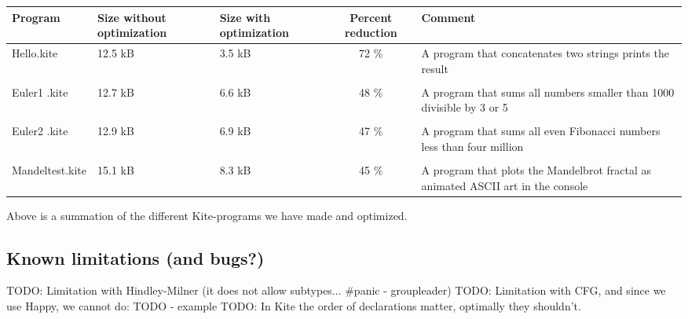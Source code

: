 \begin{center}
  \begin{tabulary}{0.9\textwidth}{|L| L |L| C | L | }
    \hline
    Program & Size without optimization & Size with optimization & Percent reduction & Comment \\
    \hline
    Hello.kite       & 12.5 kB & 3.5 kB & 72 \% & A program that concatenates two strings prints the result \\
    & & & & \\
    Euler1 .kite       & 12.7 kB & 6.6 kB & 48 \% & A program that sums all numbers smaller than 1000 divisible by 3 or 5 \\
    & & & & \\
    Euler2 .kite       & 12.9 kB & 6.9 kB & 47 \% & A program that sums all even Fibonacci numbers less than four million \\
    & & & & \\
    Mandeltest.kite       & 15.1 kB & 8.3 kB & 45 \% & A program that plots the Mandelbrot fractal as animated ASCII art in the console\\
    \hline
  \end{tabulary}  

Above is a summation of the different Kite-programs we have made and optimized.
\end{center}

\subsection{Known limitations (and bugs?)}
TODO: Limitation with Hindley-Milner (it does not allow subtypes... \#panic - groupleader)
TODO: Limitation with CFG, and since we use Happy, we cannot do: TODO - example
TODO: In Kite the order of declarations matter, optimally they shouldn't.
